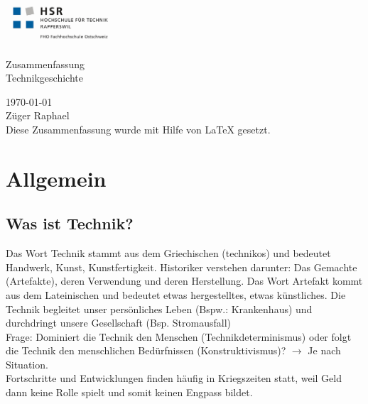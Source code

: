 \documentclass[10pt, openright=true]{scrartcl}
\begin{document}
\begin{titlepage} 
\vspace*{-\topskip}\vspace*{-\headsep} \vspace{-1.4cm}

\includegraphics[height=45pt]{images/HSRLOGO.jpg} 

\vspace{\headsep}\vspace{\topskip}
   \centering 
   \vspace{3cm}
   \fontsize{40pt}{17pt}\selectfont Zusammenfassung \\ \vspace{1cm} Technikgeschichte\\ 
   \vspace{1ex} 
   
   \vspace{1cm} 
   \Large  
   \today \\ 
   Züger Raphael \\
   \vspace{1cm} 
  \normalsize
  Diese Zusammenfassung wurde mit Hilfe von {\LaTeX} gesetzt.
   \large 
   \normalsize 

\end{titlepage} 
\pagebreak
   \tableofcontents
 \pagebreak
\section{Allgemein}
\subsection{Was ist Technik?}
Das Wort Technik stammt aus dem Griechischen (technikos) und bedeutet Handwerk, Kunst, Kunstfertigkeit. Historiker verstehen darunter: Das Gemachte (Artefakte), deren Verwendung und deren Herstellung. Das Wort Artefakt kommt aus dem Lateinischen und bedeutet etwas hergestelltes, etwas künstliches. 
Die Technik begleitet unser persönliches Leben (Bspw.: Krankenhaus) und durchdringt unsere Gesellschaft (Bsp. Stromausfall)\\
Frage: Dominiert die Technik den Menschen (Technikdeterminismus) oder folgt die Technik den menschlichen Bedürfnissen (Konstruktivismus)? $ \rightarrow $ Je nach Situation.\\
Fortschritte und Entwicklungen finden häufig in Kriegszeiten statt, weil Geld dann keine Rolle spielt und somit keinen Engpass bildet.
\end{document}
